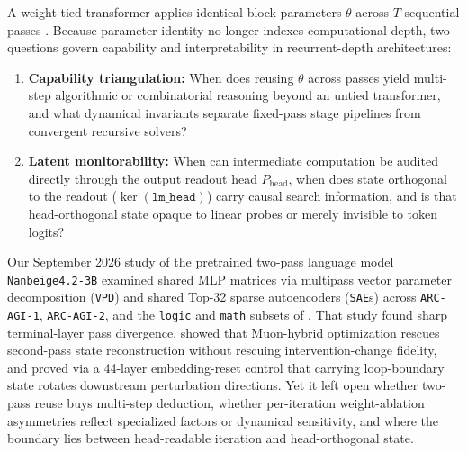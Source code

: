 \documentclass[10pt,letterpaper]{article}
\newcommand{\Phead}{P_{\mathrm{head}}}
\begin{document}
A weight-tied transformer applies identical block parameters $\theta$ across $T$ sequential passes \cite{dehghani2019universal,giannou2023looped,saunshi2025latent,geiping2025huginn,wang2025hrm,jolicoeur2025trm,li2026deeploop}. Because parameter identity no longer indexes computational depth, two questions govern capability and interpretability in recurrent-depth architectures:
\begin{enumerate}[topsep=3pt,itemsep=2pt]
  \item \textbf{Capability triangulation:} When does reusing $\theta$ across passes yield multi-step algorithmic or combinatorial reasoning beyond an untied transformer, and what dynamical invariants separate fixed-pass stage pipelines from convergent recursive solvers?
  \item \textbf{Latent monitorability:} When can intermediate computation be audited directly through the output readout head $\Phead$, when does state orthogonal to the readout ($\ker(\texttt{lm\_head})$) carry causal search information, and is that head-orthogonal state opaque to linear probes or merely invisible to token logits?
\end{enumerate}

Our September 2026 study of the pretrained two-pass language model \texttt{Nanbeige4.2-3B} \cite{nanbeige2026model,dugan2026vpd} examined shared MLP matrices via multipass vector parameter decomposition (\texttt{VPD}) \cite{braun2025apd} and shared Top-32 sparse autoencoders (\texttt{SAE}s) \cite{bricken2023monosemanticity,gao2024scaling} across \texttt{ARC-AGI-1}, \texttt{ARC-AGI-2}, and the \texttt{logic} and \texttt{math} subsets of  \cite{primeintellect2025intellect3}. That study found sharp terminal-layer pass divergence, showed that Muon-hybrid optimization \cite{jordan2024muon,dugan2026muonsae} rescues second-pass state reconstruction without rescuing intervention-change fidelity, and proved via a 44-layer embedding-reset control that carrying loop-boundary state rotates downstream perturbation directions. Yet it left open whether two-pass reuse buys multi-step deduction, whether per-iteration weight-ablation asymmetries reflect specialized factors or dynamical sensitivity, and where the boundary lies between head-readable iteration and head-orthogonal state.
\end{document}
